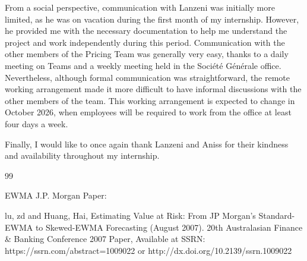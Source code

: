 \documentclass{article}
\begin{document}
From a social perspective, communication with Lanzeni was initially more limited, as he was on vacation during the first month of my internship. However, he provided me with the necessary documentation to help me understand the project and work independently during this period. Communication with the other members of the Pricing Team was generally very easy, thanks to a daily meeting on Teams and a weekly meeting held in the Société Générale office. Nevertheless, although formal communication was straightforward, the remote working arrangement made it more difficult to have informal discussions with the other members of the team. This working arrangement is expected to change in October 2026, when employees will be required to work from the office at least four days a week.

Finally, I would like to once again thank Lanzeni and Aniss for their kindness and availability throughout my internship.

\clearpage
\begin{thebibliography}{99}

EWMA J.P. Morgan Paper: 

lu, zd and Huang, Hai, Estimating Value at Risk: From JP Morgan's Standard-EWMA to Skewed-EWMA Forecasting (August 2007). 20th Australasian Finance & Banking Conference 2007 Paper, Available at SSRN: https://ssrn.com/abstract=1009022 or http://dx.doi.org/10.2139/ssrn.1009022

\end{thebibliography}
\end{document}
